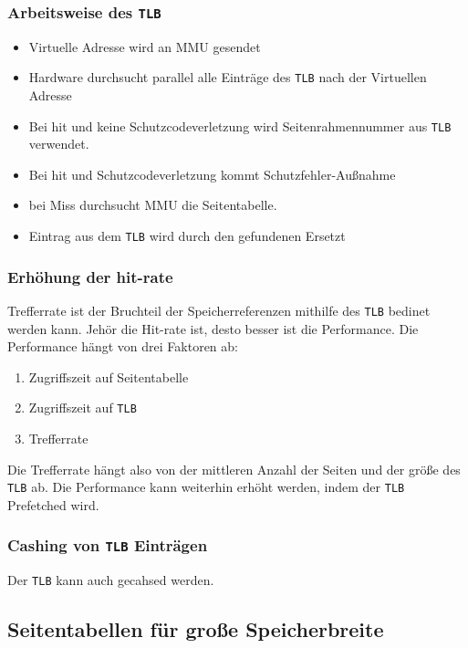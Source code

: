 \subsubsection{Arbeitsweise des \texttt{TLB}}

\begin{itemize}
    \item Virtuelle Adresse wird an MMU gesendet
    \item Hardware durchsucht parallel alle Einträge des \texttt{TLB} nach der Virtuellen
          Adresse
    \item Bei hit und keine Schutzcodeverletzung wird Seitenrahmennummer aus \texttt{TLB}
          verwendet.
    \item Bei hit und Schutzcodeverletzung kommt Schutzfehler-Außnahme
    \item bei Miss durchsucht MMU die Seitentabelle.
    \item Eintrag aus dem \texttt{TLB} wird durch den gefundenen Ersetzt
\end{itemize}

\subsubsection{Erhöhung der hit-rate}

Trefferrate ist der Bruchteil der Speicherreferenzen mithilfe des \texttt{TLB}
bedinet werden kann. Jehör die Hit-rate ist, desto besser ist die Performance.
Die Performance hängt von drei Faktoren ab:

\begin{enumerate}
    \item Zugriffszeit auf Seitentabelle
    \item Zugriffszeit auf \texttt{TLB}
    \item Trefferrate
\end{enumerate}

Die Trefferrate hängt also von der mittleren Anzahl der Seiten und der größe
des \texttt{TLB} ab. Die Performance kann weiterhin erhöht werden, indem der
\texttt{TLB} Prefetched wird.

\subsubsection*{Cashing von \texttt{TLB} Einträgen}

Der \texttt{TLB} kann auch gecahsed werden.

\subsection{Seitentabellen für große Speicherbreite}

